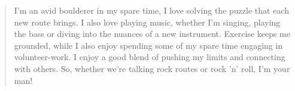 \documentclass[10pt,a4paper,ragged2e,withhyper]{altacv}
\begin{document}

            \divider
        

            \divider


        \begin{quote}
            I'm an avid boulderer in my spare time, I love solving the puzzle that each new route brings. I also love playing music, whether I'm singing, playing the bass or diving into the nuances of a new instrument. Exercise keeps me grounded, while I also enjoy spending some of my spare time engaging in volunteer-work. I enjoy a good blend of pushing my limits and connecting with others. So, whether we're talking rock routes or rock 'n' roll, I'm your man!
        \end{quote}
\end{document}

